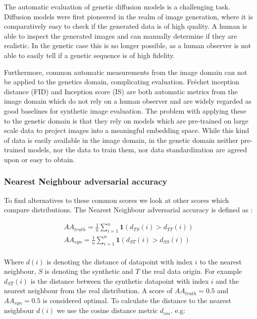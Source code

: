 The automatic evaluation of genetic diffusion models is a challenging task. Diffusion models were first pioneered in the realm of image generation, where it is comparatively easy to check if the generated data is of high quality. A human is able to inspect the generated images and can manually determine if they are realistic. 
In the genetic case this is no longer possible, as a human observer is not able to easily tell if a genetic sequence is of high fidelity. 


Furthermore, common automatic measurements from the image domain can not be applied to the genetics domain, complicating evaluation. Fréchet inception distance (FID) \citep{fid} and Inception score (IS) \citep{is} are both automatic metrics from the image domain which do not rely on a human observer and are widely regarded as good baselines for synthetic image evaluation. The problem with applying these to the genetic domain is that they rely on models which are pre-trained on large scale data to project images into a meaningful embedding space. While this kind of data is easily available in the image domain, in the genetic domain neither pre-trained models, nor the data to train them, nor data standardization are agreed upon or easy to obtain.

\subsubsection{Nearest Neighbour adversarial accuracy}
To find alternatives to these common scores we look at other scores which compare distributions.
The Nearest Neighbour adversarial accuracy is defined as \cite{yale2019privacy}:

\begin{equation} 
\begin{aligned}
        AA_{truth} = \frac{1}{n}\sum_{i=1}^n \mathbf{1} (d_{TS}(i)>d_{TT}(i)) \\
    AA_{syn} = \frac{1}{n}\sum_{i=1}^n \mathbf{1} (d_{ST}(i)>d_{SS}(i)) \\
\end{aligned}
\end{equation}

Where $d(i)$ is denoting the distance of datapoint with index $i$ to the nearest neighbour, $S$ is denoting the synthetic and $T$ the real data origin. For example $d_{ST}(i)$ is the distance between the synthetic datapoint with index $i$ and the nearest neighbour from the real distribution. A score of $AA_{truth} = 0.5$ and $AA_{syn} = 0.5$ is considered optimal. 
To calculate the distance to the nearest neighbour $d(i)$ we use the cosine distance metric $d_{cos}$. e.g:

